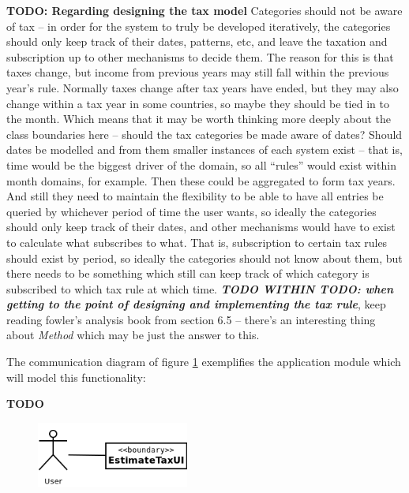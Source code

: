 \textbf{TODO: Regarding designing the tax model} Categories should not be aware
of tax -- in order for the system to truly be developed iteratively, the
categories should only keep track of their dates, patterns, etc, and leave the
taxation and subscription up to other mechanisms to decide them. The reason for
this is that taxes change, but income from previous years may still fall within
the previous year's rule. Normally taxes change after tax years have ended, but
they may also change within a tax year in some countries, so maybe they should
be tied in to the month. Which means that it may be worth thinking more deeply
about the class boundaries here -- should the tax categories be made aware of
dates? Should dates be modelled and from them smaller instances of each system
exist -- that is, time would be the biggest driver of the domain, so all
``rules'' would exist within month domains, for example. Then these could be
aggregated to form tax years. And still they need to maintain the flexibility
to be able to have all entries be queried by whichever period of time the user
wants, so ideally the categories should only keep track of their dates, and
other mechanisms would have to exist to calculate what subscribes to what. That
is, subscription to certain tax rules should exist by period, so ideally the
categories should not know about them, but there needs to be something which
still can keep track of which category is subscribed to which tax rule at which
time. \textbf{\emph{TODO WITHIN TODO: when getting to the point of designing
and implementing the tax rule}}, keep reading fowler's analysis book from
section 6.5 -- there's an interesting thing about \emph{Method} which may be
just the answer to this.

The communication diagram of figure \ref{fig:CommDiagram.EstimateTax}
exemplifies the application module which will model this functionality:

\textbf{TODO}

\begin{figure}[ht!]
  \begin{center}
    \includegraphics[width=5cm]{./contents/img/Comm_Diagram_-_Estimate_Tax.png}
  \end{center}
  \caption{}
  \label{fig:CommDiagram.EstimateTax}
\end{figure}
\FloatBarrier


